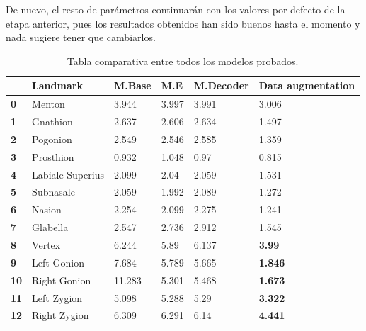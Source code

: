         \medskip

        \noindent De nuevo, el resto de parámetros continuarán con los valores por defecto de la etapa anterior, pues los resultados obtenidos han sido buenos hasta el momento y nada sugiere tener que cambiarlos.

        \begin{table}[!ht]
            \centering
            \caption{Tabla comparativa entre todos los modelos probados.}
            \begin{tabular}{|l|l|l|l|l|l|}
            \hline
                \textbf{} & \textbf{Landmark} & \textbf{M.Base} & \textbf{M.E} & \textbf{M.Decoder} & \textbf{Data augmentation} \\ \hline
                \textbf{0} & Menton & 3.944 & 3.997 & 3.991 & \cellcolor{green!25}3.006 \\ \hline
                \textbf{1} & Gnathion & 2.637 & 2.606 & 2.634 & \cellcolor{green!25}1.497 \\ \hline
                \textbf{2} & Pogonion & 2.549 & 2.546 & 2.585 & \cellcolor{green!25}1.359 \\ \hline
                \textbf{3} & Prosthion & 0.932 & 1.048 & 0.97 & \cellcolor{green!25}0.815 \\ \hline
                \textbf{4} & Labiale Superius & 2.099 & 2.04 & 2.059 & \cellcolor{green!25}1.531 \\ \hline
                \textbf{5} & Subnasale & 2.059 & 1.992 & 2.089 & \cellcolor{green!25}1.272 \\ \hline
                \textbf{6} & Nasion & 2.254 & 2.099 & 2.275 & \cellcolor{green!25}1.241 \\ \hline
                \textbf{7} & Glabella & 2.547 & 2.736 & 2.912 & \cellcolor{green!25}1.545 \\ \hline
                \textbf{8} & Vertex & 6.244 & 5.89 & 6.137 & \cellcolor{green!50}\textbf{3.99} \\ \hline
                \textbf{9} & Left Gonion & 7.684 & 5.789 & 5.665 & \cellcolor{green!50}\textbf{1.846} \\ \hline
                \textbf{10} & Right Gonion & 11.283 & 5.301 & 5.468 & \cellcolor{green!50}\textbf{1.673} \\ \hline
                \textbf{11} & Left Zygion & 5.098 & 5.288 & 5.29 & \cellcolor{green!50} \textbf{3.322} \\ \hline
                \textbf{12} & Right Zygion & 6.309 & 6.291 & 6.14 & \cellcolor{green!50} \textbf{4.441} \\ \hline

\end{tabular}
\end{table}
